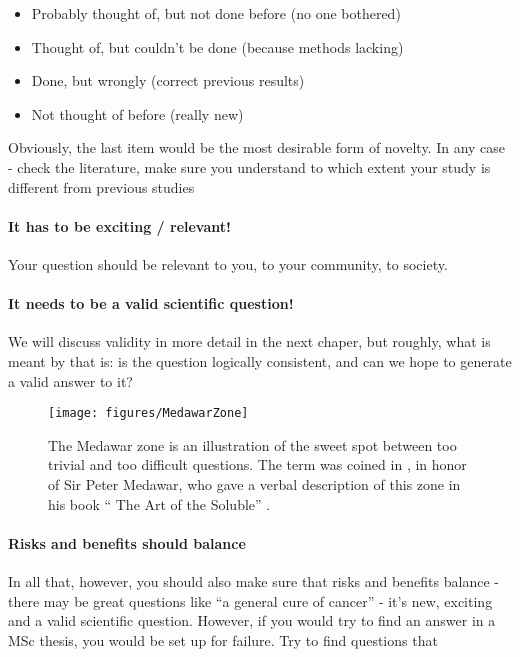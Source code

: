 \documentclass{tufte-book}
\begin{document}
\begin{itemize}
\item Probably thought of, but not done before (no one bothered)
\item Thought of, but couldn’t be done (because methods lacking)
\item Done, but wrongly (correct previous results)
\item Not thought of before (really new)
\end{itemize}

Obviously, the last item would be the most desirable form of novelty. In any case - check the literature, make sure you understand to which extent your study is different from previous studies

\paragraph{It has to be exciting / relevant!} Your question should be relevant to you, to your community, to society.

\paragraph{It needs to be a valid scientific question!} We will discuss validity in more detail in the next chaper, but roughly, what is meant by that is: is the question logically consistent, and can we hope to generate a valid answer to it?


\begin{figure}[]
\begin{center}
\texttt{[image: figures/MedawarZone]}
\caption{The Medawar zone is an illustration of the sweet spot between too trivial and too difficult questions. The term was coined in \citet{Loehle-guidetoincreased-1990}, in honor of Sir Peter Medawar, who gave a verbal description of this zone in his book `` The Art of the Soluble'' \citep{Medawar-artsoluble-1967}.}
\label{fig: MedawarZone}
\end{center}
\end{figure}

\paragraph{Risks and benefits should balance} In all that, however, you should also make sure that risks and benefits balance - there may be great questions like ``a general cure of cancer'' - it's new, exciting and a valid scientific question. However, if you would try to find an answer in a MSc thesis, you would be set up for failure. Try to find questions that
\end{document}
